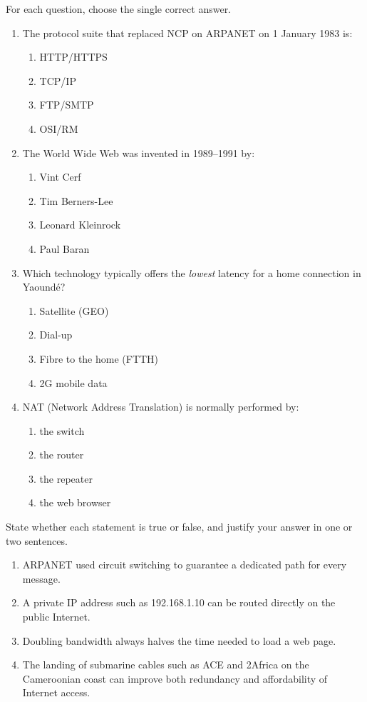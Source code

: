 \documentclass[11pt]{article}
\begin{document}
\begin{exercice}
For each question, choose the single correct answer.
\begin{enumerate}
\item The protocol suite that replaced NCP on ARPANET on 1 January 1983 is:
\begin{enumerate}
\item HTTP/HTTPS \item TCP/IP \item FTP/SMTP \item OSI/RM
\end{enumerate}
\item The World Wide Web was invented in 1989--1991 by:
\begin{enumerate}
\item Vint Cerf \item Tim Berners-Lee \item Leonard Kleinrock \item Paul Baran
\end{enumerate}
\item Which technology typically offers the \emph{lowest} latency for a home connection in Yaound\'e?
\begin{enumerate}
\item Satellite (GEO) \item Dial-up \item Fibre to the home (FTTH) \item 2G mobile data
\end{enumerate}
\item NAT (Network Address Translation) is normally performed by:
\begin{enumerate}
\item the switch \item the router \item the repeater \item the web browser
\end{enumerate}
\end{enumerate}
\end{exercice}

\begin{exercice}
State whether each statement is true or false, and justify your answer in one or two sentences.
\begin{enumerate}
\item ARPANET used circuit switching to guarantee a dedicated path for every message.
\item A private IP address such as 192.168.1.10 can be routed directly on the public Internet.
\item Doubling bandwidth always halves the time needed to load a web page.
\item The landing of submarine cables such as ACE and 2Africa on the Cameroonian coast can improve both redundancy and affordability of Internet access.
\end{enumerate}
\end{exercice}
\end{document}
